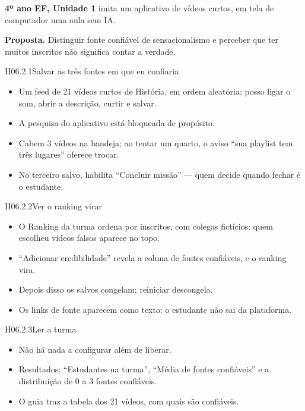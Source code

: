 \textbf{4º ano EF, Unidade 1} \textperiodcentered{} imita um aplicativo de
vídeos curtos, em tela de computador \textperiodcentered{} uma aula
\textperiodcentered{} sem IA.

\textbf{Proposta.} Distinguir fonte confiável de sensacionalismo e perceber
que ter muitos inscritos não significa contar a verdade.

\begin{historia}{H06.2.1}{Salvar as três fontes em que eu confiaria}{\arquivada}
\aceite
\begin{itemize}
  \item Um feed de 21 vídeos curtos de História, em ordem aleatória; posso
    ligar o som, abrir a descrição, curtir e salvar.
  \item A pesquisa do aplicativo está bloqueada de propósito.
  \item Cabem 3 vídeos na bandeja; ao tentar um quarto, o aviso \enquote{sua
    playlist tem três lugares} oferece trocar.
  \item No terceiro salvo, habilita \enquote{Concluir missão} --- quem decide
    quando fechar é o estudante.
\end{itemize}
\end{historia}

\begin{historia}{H06.2.2}{Ver o ranking virar}{\arquivada}
\aceite
\begin{itemize}
  \item O Ranking da turma ordena por inscritos, com colegas fictícios: quem
    escolheu vídeos falsos aparece no topo.
  \item \enquote{Adicionar credibilidade} revela a coluna de fontes confiáveis,
    e o ranking vira.
  \item Depois disso os salvos congelam; reiniciar descongela.
  \item Os links de fonte aparecem como texto: o estudante não sai da
    plataforma.
\end{itemize}
\end{historia}

\begin{historia}{H06.2.3}{Ler a turma}{\arquivada}
\aceite
\begin{itemize}
  \item Não há nada a configurar além de liberar.
  \item Resultados: \enquote{Estudantes na turma}, \enquote{Média de fontes
    confiáveis} e a distribuição de 0 a 3 fontes confiáveis.
  \item O guia traz a tabela dos 21 vídeos, com quais são confiáveis.
\end{itemize}
\end{historia}

